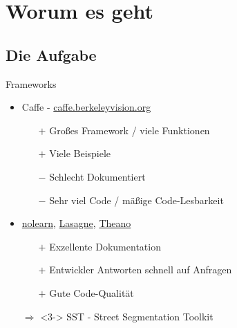 \section{Worum es geht}

\subsection{Die Aufgabe}


\begin{frame}{Frameworks}
    \begin{itemize}
        \item<1-> Caffe - \href{http://caffe.berkeleyvision.org/}{caffe.berkeleyvision.org}
        \begin{itemize}
            \item[$+$] Großes Framework / viele Funktionen
            \item[$+$] Viele Beispiele
            \item[$-$] Schlecht Dokumentiert
            \item[$-$] Sehr viel Code / mäßige Code-Lesbarkeit
        \end{itemize}
        \item<2-> \href{https://github.com/dnouri/nolearn}{nolearn}, \href{https://github.com/Lasagne/Lasagne}{Lasagne}, \href{https://github.com/Theano/Theano}{Theano}
        \begin{itemize}
            \item[$+$] Exzellente Dokumentation
            \item[$+$] Entwickler Antworten schnell auf Anfragen
            \item[$+$] Gute Code-Qualität
        \end{itemize}
        \item[$\Rightarrow$]<3-> SST - Street Segmentation Toolkit
    \end{itemize}
\end{frame}